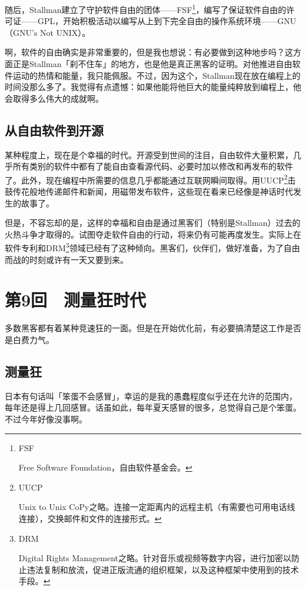 \documentclass[a4paper,12pt]{article}
\begin{document}
随后，Stallman建立了守护软件自由的团体——FSF\footnote{FSF

  Free Software Foundation，自由软件基金会。}，编写了保证软件自由的许可证——GPL，开始积极活动以编写从上到下完全自由的操作系统环境——GNU（GNU's Not UNIX）。

啊，软件的自由确实是非常重要的，但是我也想说：有必要做到这种地步吗？这方面正是Stallman「刹不住车」的地方，也是他是真正黑客的证明。对他推进自由软件运动的热情和能量，我只能佩服。不过，因为这个，Stallman现在放在编程上的时间没那么多了。我觉得有点遗憾：如果他能将他巨大的能量纯粹放到编程上，他会取得多么伟大的成就啊。

\subsection{从自由软件到开源}

某种程度上，现在是个幸福的时代。开源受到世间的注目，自由软件大量积累，几乎所有类别的软件中都有了能自由查看源代码、必要时加以修改和再发布的软件了。此外，现在编程中所需要的信息几乎都能通过互联网瞬间取得。用UUCP\footnote{UUCP

Unix to Unix CoPy之略。连接一定距离内的远程主机（有需要也可用电话线连接），交换邮件和文件的连接形式。}击鼓传花般地传递邮件和新闻，用磁带发布软件，这些现在看来已经像是神话时代发生的故事了。

但是，不容忘却的是，这样的幸福和自由是通过黑客们（特别是Stallman）过去的火热斗争才取得的。试图夺走软件自由的行动，将来仍有可能再度发生。实际上在软件专利和DRM\footnote{DRM

Digital Rights Management之略。针对音乐或视频等数字内容，进行加密以防止违法复制和放流，促进正版流通的组织框架，以及这种框架中使用到的技术手段。}领域已经有了这种倾向。黑客们，伙伴们，做好准备，为了自由而战的时刻或许有一天又要到来。


\section{第9回　测量狂时代}

多数黑客都有着某种竞速狂的一面。但是在开始优化前，有必要搞清楚这工作是否是白费力气。

\subsection{测量狂}

日本有句话叫「笨蛋不会感冒」，幸运的是我的愚蠢程度似乎还在允许的范围内，每年还是得上几回感冒。话虽如此，每年夏天感冒的很多，总觉得自己是个笨蛋。不过今年好像没事啊。
\end{document}
